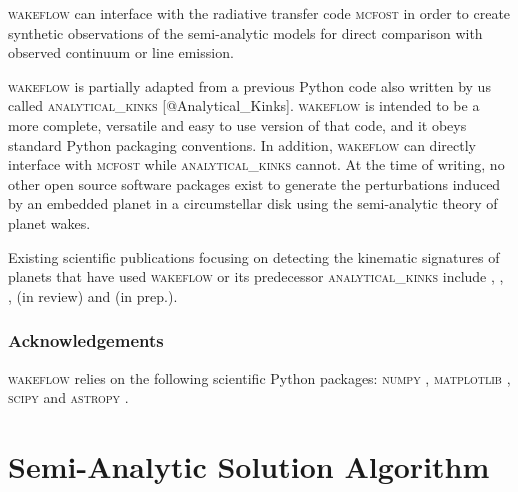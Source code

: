 \textsc{wakeflow} can interface with the radiative transfer code  \textsc{mcfost} \citep{pinte2006,pinte2009} in order to create synthetic observations of the semi-analytic models for direct comparison with observed continuum or line emission.

\textsc{wakeflow} is partially adapted from a previous Python code also written by us called \textsc{analytical\_kinks} [@Analytical\_Kinks]. 
\textsc{wakeflow} is intended to be a more complete, versatile and easy to use version of that code, and it obeys standard Python packaging conventions.
In addition, \textsc{wakeflow} can directly interface with \textsc{mcfost} while \textsc{analytical\_kinks} cannot.
At the time of writing, no other open source software packages exist to generate the perturbations induced by an embedded planet in a circumstellar disk using the semi-analytic theory of planet wakes.

Existing scientific publications focusing on detecting the kinematic signatures of planets that have used \textsc{wakeflow} or its predecessor \textsc{analytical\_kinks} include \citet{bollati2021}, \citet{calcino2022}, \citet{teague2022}, \citeauthor{garginreview} (in review) and \citeauthor{fasanoinprep.} (in prep.).

\subsubsection{Acknowledgements}

\textsc{wakeflow} relies on the following scientific Python packages: \textsc{numpy} \citep{harris2020}, \textsc{matplotlib} \citep{hunter2007}, \textsc{scipy} \citep{virtanen2020} and \textsc{astropy} \citep{astropycollaboration2022}.

\section{Semi-Analytic Solution Algorithm}

